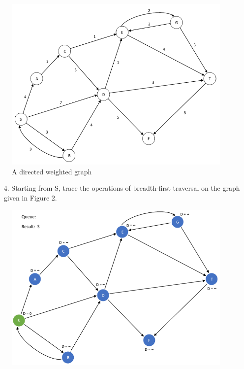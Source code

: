\documentclass{article}
\begin{document}
\begin{figure}[H]
\centering
\includegraphics[scale=0.8]{figure-2}
\caption{A directed weighted graph}
\end{figure}

\begin{enumerate}[leftmargin=\labelsep]
  \item[4.] Starting from S, trace the operations of breadth-first traversal on the graph given in Figure 2.
\end{enumerate}

\begin{figure}[H]
\centering
\includegraphics[scale=0.6]{images/Q4/01.png}
\end{figure}
\end{document}
